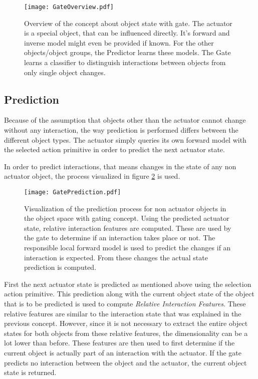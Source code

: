 \begin{figure}
	\centering
	\texttt{[image: GateOverview.pdf]}
	\caption{Overview of the concept about object state with gate. The actuator is a special object, that can be influenced directly. It's forward and inverse model might even be provided if known. For the other objects/object groups, the Predictor learns these models. The Gate learns a classifier to distinguish interactions between objects from only single object changes.} 
	\label{fig:GateOverview}
\end{figure}

\subsection{Prediction}

Because of the assumption that objects other than the actuator cannot change without any interaction, the way prediction is performed differs between the different object types. The actuator simply queries its own forward model with the selected action primitive in order to predict the next actuator state. 

In order to predict interactions, that means changes in the state of any non actuator object, the process visualized in figure \ref{fig:GatePrediction} is used.

\begin{figure}
	\centering
	\texttt{[image: GatePrediction.pdf]}
	\caption{Visualization of the prediction process for non actuator objects in the object space with gating concept. Using the predicted actuator state, relative interaction features are computed. These are used by the gate to determine if an interaction takes place or not. The responsible local forward model is used to predict the changes if an interaction is expected. From these changes the actual state prediction is computed.} 
	\label{fig:GatePrediction}
\end{figure}

First the next actuator state is predicted as mentioned above using the selection action primitive.
This prediction along with the current object state of the object that is to be predicted is used to compute \textit{Relative Interaction Features}. These relative features are similar to the interaction state that was explained in the previous concept. However, since it is not necessary to extract the entire object states for both objects from these relative features, the dimensionality can be a lot lower than before. These features are then used to first determine if the current object is actually part of an interaction with the actuator. If the gate predicts no interaction between the object and the actuator, the current object state is returned. 

